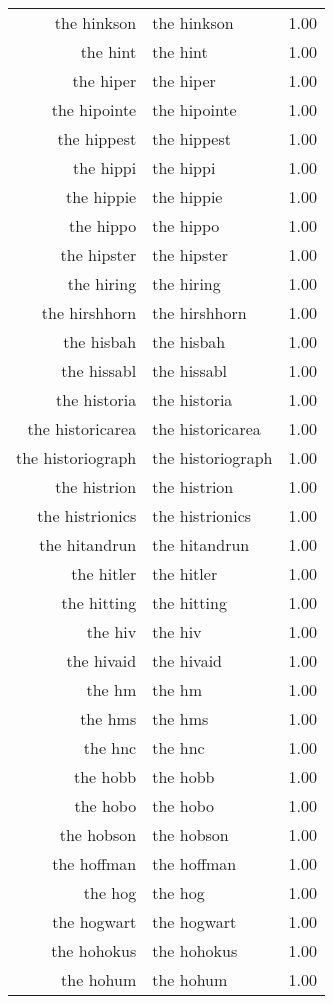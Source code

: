 \begin{table}[ht]
\begin{tabular}{rlr}
  the hinkson & the hinkson & 1.00 \\ 
  the hint & the hint & 1.00 \\ 
  the hiper & the hiper & 1.00 \\ 
  the hipointe & the hipointe & 1.00 \\ 
  the hippest & the hippest & 1.00 \\ 
  the hippi & the hippi & 1.00 \\ 
  the hippie & the hippie & 1.00 \\ 
  the hippo & the hippo & 1.00 \\ 
  the hipster & the hipster & 1.00 \\ 
  the hiring & the hiring & 1.00 \\ 
  the hirshhorn & the hirshhorn & 1.00 \\ 
  the hisbah & the hisbah & 1.00 \\ 
  the hissabl & the hissabl & 1.00 \\ 
  the historia & the historia & 1.00 \\ 
  the historicarea & the historicarea & 1.00 \\ 
  the historiograph & the historiograph & 1.00 \\ 
  the histrion & the histrion & 1.00 \\ 
  the histrionics & the histrionics & 1.00 \\ 
  the hitandrun & the hitandrun & 1.00 \\ 
  the hitler & the hitler & 1.00 \\ 
  the hitting & the hitting & 1.00 \\ 
  the hiv & the hiv & 1.00 \\ 
  the hivaid & the hivaid & 1.00 \\ 
  the hm & the hm & 1.00 \\ 
  the hms & the hms & 1.00 \\ 
  the hnc & the hnc & 1.00 \\ 
  the hobb & the hobb & 1.00 \\ 
  the hobo & the hobo & 1.00 \\ 
  the hobson & the hobson & 1.00 \\ 
  the hoffman & the hoffman & 1.00 \\ 
  the hog & the hog & 1.00 \\ 
  the hogwart & the hogwart & 1.00 \\ 
  the hohokus & the hohokus & 1.00 \\ 
  the hohum & the hohum & 1.00 \\ 

\end{tabular}
\end{table}
